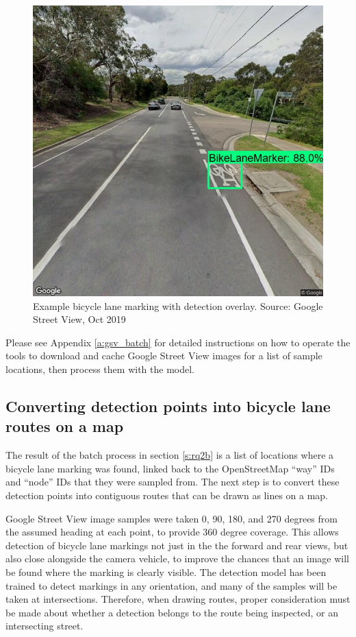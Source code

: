 \documentclass[11pt,twoside]{report}
\begin{document}
\begin{figure}[h!]
\centering
\includegraphics[width=0.5\linewidth]{f004_gsv_detection_example.jpg}
\caption{Example bicycle lane marking with detection overlay.  Source: Google Street View, Oct 2019}
\label{fig:004}
\end{figure}

Please see Appendix \ref{a:gsv_batch} for detailed instructions on how to operate the tools to download and cache Google Street View images for a list of sample locations, then process them with the model.


\subsection{Converting detection points into bicycle lane routes on a map}
\label{s:rq2c}

The result of the batch process in section \ref{s:rq2b} is a list of locations where a bicycle lane marking was found, linked back to the OpenStreetMap ``way'' IDs and ``node'' IDs that they were sampled from.  The next step is to convert these detection points into contiguous routes that can be drawn as lines on a map.

Google Street View image samples were taken 0, 90, 180, and 270 degrees from the assumed heading at each point, to provide 360 degree coverage.  This allows detection of bicycle lane markings not just in the the forward and rear views, but also close alongside the camera vehicle, to improve the chances that an image will be found where the marking is clearly visible.  The detection model has been trained to detect markings in any orientation, and many of the samples will be taken at intersections.  Therefore, when drawing routes, proper consideration must be made about whether a detection belongs to the route being inspected, or an intersecting street.
\end{document}
